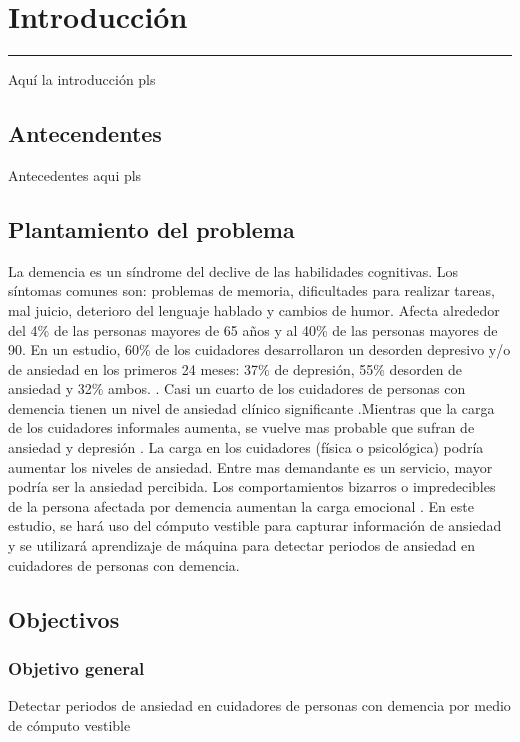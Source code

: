 
\chapter{Introducci\'on}\label{capit:cap1}
\vspace{-2.0325ex}%
\noindent
\rule{\textwidth}{0.5pt}
\vspace{-5.5ex}%
\newcommand{\pushline}{\Indp}

Aqu\'i la introducci\'on pls
\section{Antecendentes}
Antecedentes aqui pls
\section{Plantamiento del problema}
	La demencia es un s\'indrome del declive de las habilidades cognitivas. Los s\'intomas comunes son: problemas de memoria, dificultades para realizar tareas, mal juicio, deterioro del lenguaje hablado y cambios de humor\citep{Aziz}. Afecta alrededor del 4\% de las personas mayores de 65 a\~nos y al 40\% de las personas mayores de 90.
	        En un estudio, 60\% de los cuidadores desarrollaron un desorden depresivo y/o de ansiedad en los primeros 24 meses: 37\% de depresi\'on, 55\% desorden de ansiedad y 32\% ambos. \citep{Joling2014}. Casi un cuarto de los cuidadores de personas con demencia tienen un nivel de ansiedad cl\'inico significante \citep{Cooper200615}.Mientras que la carga de los cuidadores informales aumenta, se vuelve mas probable que sufran de ansiedad y depresi\'on \citep{Denno20131731}. La carga en los cuidadores (f\'isica o psicol\'ogica) podr\'ia aumentar los niveles de ansiedad. Entre mas demandante es un servicio, mayor podr\'ia ser la ansiedad percibida. Los comportamientos bizarros o impredecibles de la persona afectada por demencia aumentan la carga emocional \citep{Rosa201054}. En este estudio, se har\'a uso del c\'omputo vestible para capturar informaci\'on de ansiedad y se utilizar\'a aprendizaje de m\'aquina para detectar periodos de ansiedad en cuidadores de personas con demencia.

\section{Objectivos}
\subsection{Objetivo general}
	Detectar periodos de ansiedad en cuidadores de personas con demencia por medio de c\'omputo vestible

